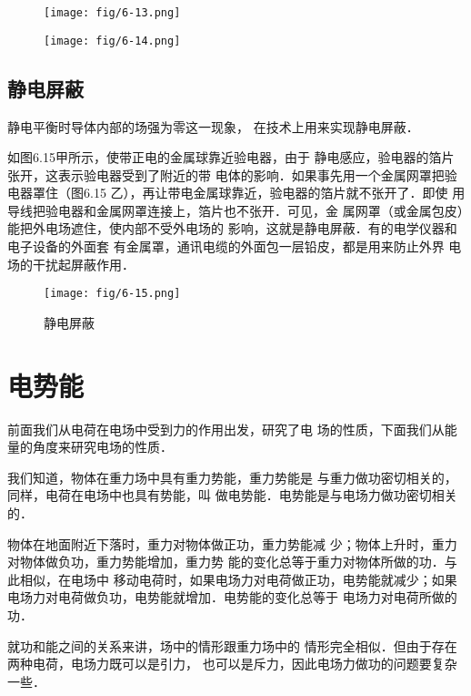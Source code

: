 \begin{figure}[htp]
	\centering
	\begin{minipage}[t]{0.48\textwidth}
	\centering
	\texttt{[image: fig/6-13.png]}
	\caption{}
	\end{minipage}
	\begin{minipage}[t]{0.48\textwidth}
	\centering
	\texttt{[image: fig/6-14.png]}
	\caption{}
	\end{minipage}
	\end{figure}

\subsection{静电屏蔽}

静电平衡时导体内部的场强为零这一现象，
在技术上用来实现静电屏蔽．


如图6.15甲所示，使带正电的金属球靠近验电器，由于
静电感应，验电器的箔片张开，这表示验电器受到了附近的带
电体的影响．如果事先用一个金属网罩把验电器罩住（图6.15
乙），再让带电金属球靠近，验电器的箔片就不张开了．即使
用导线把验电器和金属网罩连接上，箔片也不张开．可见，金
属网罩（或金属包皮）能把外电场遮住，使内部不受外电场的
影响，这就是静电屏蔽．有的电学仪器和电子设备的外面套
有金属罩，通讯电缆的外面包一层铅皮，都是用来防止外界
电场的干扰起屏蔽作用．

\begin{figure}[htp]\centering
	\texttt{[image: fig/6-15.png]}
	\caption{静电屏蔽}
	\end{figure}


\section{电势能}
前面我们从电荷在电场中受到力的作用出发，研究了电
场的性质，下面我们从能量的角度来研究电场的性质．

我们知道，物体在重力场中具有重力势能，重力势能是
与重力做功密切相关的，同样，电荷在电场中也具有势能，叫
做电势能．电势能是与电场力做功密切相关的．

物体在地面附近下落时，重力对物体做正功，重力势能减
少；物体上升时，重力对物体做负功，重力势能增加，重力势
能的变化总等于重力对物体所做的功．与此相似，在电场中
移动电荷时，如果电场力对电荷做正功，电势能就减少；如果
电场力对电荷做负功，电势能就增加．电势能的变化总等于
电场力对电荷所做的功．

就功和能之间的关系来讲，场中的情形跟重力场中的
情形完全相似．但由于存在两种电荷，电场力既可以是引力，
也可以是斥力，因此电场力做功的问题要复杂一些．

